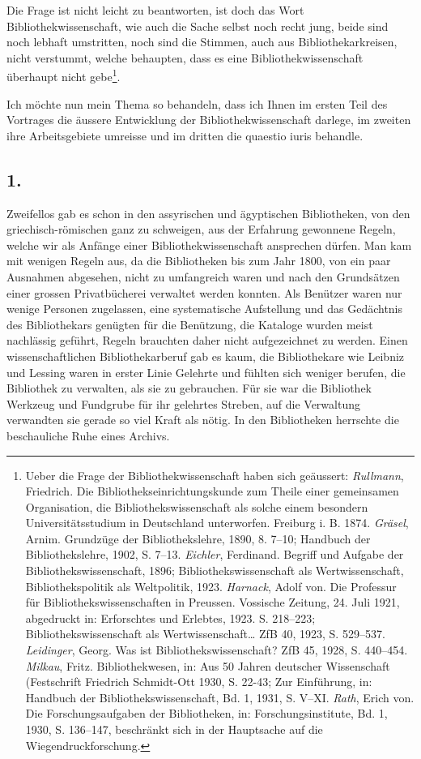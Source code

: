 \documentclass[a4paper,
fontsize=11pt,
oneside,
numbers=noperiodatend,
parskip=half-,
bibliography=totoc,
final
]{scrartcl}
\begin{document}
Die Frage ist nicht leicht zu beantworten, ist doch das Wort
Bibliothekwissenschaft, wie auch die Sache selbst noch recht jung, beide
sind noch lebhaft umstritten, noch sind die Stimmen, auch aus
Bibliothekarkreisen, nicht verstummt, welche behaupten, dass es eine
Bibliothekwissenschaft überhaupt nicht gebe\footnote{Ueber die Frage der
  Bibliothekwissenschaft haben sich geäussert: \emph{Rullmann},
  Friedrich. Die Bibliothekseinrichtungskunde zum Theile einer
  gemeinsamen Organisation, die Bibliothekswissenschaft als solche einem
  besondern Universitätsstudium in Deutschland unterworfen. Freiburg i.
  B. 1874. \emph{Gräsel}, Arnim. Grundzüge der Bibliothekslehre, 1890,
  8. 7--10; Handbuch der Bibliothekslehre, 1902, S. 7--13.
  \emph{Eichler}, Ferdinand. Begriff und Aufgabe der
  Bibliothekswissenschaft, 1896; Bibliothekswissenschaft als
  Wertwissenschaft, Bibliothekspolitik als Weltpolitik, 1923.
  \emph{Harnack}, Adolf von. Die Professur für Bibliothekswissenschaften
  in Preussen. Vossische Zeitung, 24. Juli 1921, abgedruckt in:
  Erforschtes und Erlebtes, 1923. S. 218--223; Bibliothekswissenschaft
  als Wertwissenschaft\ldots{} ZfB 40, 1923, S. 529--537.
  \emph{Leidinger}, Georg. Was ist Bibliothekswissenschaft? ZfB 45,
  1928, S. 440--454. \emph{Milkau}, Fritz. Bibliothekwesen, in: Aus 50
  Jahren deutscher Wissenschaft (Festschrift Friedrich Schmidt-Ott 1930,
  S. 22-43; Zur Einführung, in: Handbuch der Bibliothekswissenschaft,
  Bd. 1, 1931, S. V--XI. \emph{Rath}, Erich von. Die Forschungsaufgaben
  der Bibliotheken, in: Forschungsinstitute, Bd. 1, 1930, S. 136--147,
  beschränkt sich in der Hauptsache auf die Wiegendruckforschung.}.

Ich möchte nun mein Thema so behandeln, dass ich Ihnen im ersten Teil
des Vortrages die äussere Entwicklung der Bibliothekwissenschaft
darlege, im zweiten ihre Arbeitsgebiete umreisse und im dritten die
quaestio iuris behandle.


\subsection*{1.}

Zweifellos gab es schon in den assyrischen und ägyptischen Bibliotheken,
von den griechisch-römischen ganz zu schweigen, aus der Erfahrung
gewonnene Regeln, welche wir als Anfänge einer Bibliothekwissenschaft
ansprechen dürfen. Man kam mit wenigen Regeln aus, da die Bibliotheken
bis zum Jahr 1800, von ein paar Ausnahmen abgesehen, nicht zu
umfangreich waren und nach den Grundsätzen einer grossen Privatbücherei
verwaltet werden konnten. Als Benützer waren nur wenige Personen
zugelassen, eine systematische Aufstellung und das Gedächtnis des
Bibliothekars genügten für die Benützung, die Kataloge wurden meist
nachlässig geführt, Regeln brauchten daher nicht aufgezeichnet zu
werden. Einen wissenschaftlichen Bibliothekarberuf gab es kaum, die
Bibliothekare wie Leibniz und Lessing waren in erster Linie Gelehrte und
fühlten sich weniger berufen, die Bibliothek zu verwalten, als sie zu
gebrauchen. Für sie war die Bibliothek Werkzeug und Fundgrube für ihr
gelehrtes Streben, auf die Verwaltung verwandten sie gerade so viel
Kraft als nötig. In den Bibliotheken herrschte die beschauliche Ruhe
eines Archivs.
\end{document}
